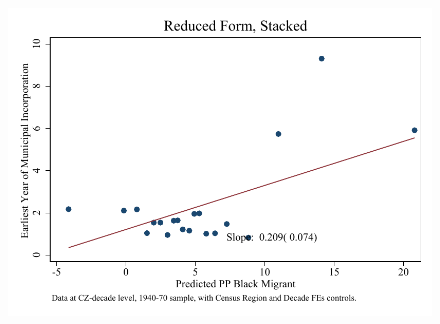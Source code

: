 \documentclass{article}
\begin{document}
\begin{figure}
\centering
\includegraphics{figures/simplefigs/stacked_cgoodman_raw_C3_urban_rf.pdf}
\end{figure}
\clearpage
\end{document}
